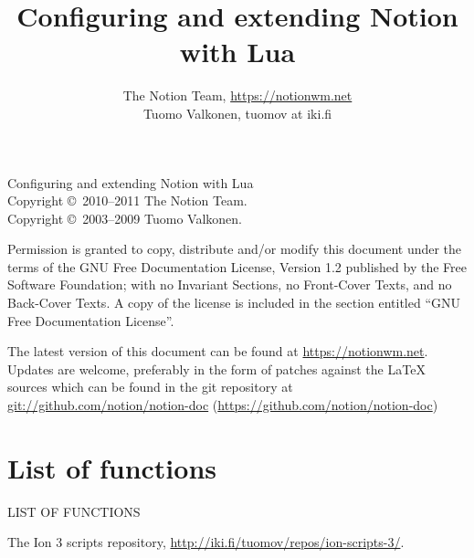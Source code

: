 \documentclass[english,a4paper,11pt,oldtoc,mctitle]{rapport3}
\title{Configuring and extending Notion with Lua}
\author{The Notion Team, \url{https://notionwm.net} \\ 
	Tuomo Valkonen, tuomov at iki.fi}
\begin{document}
\maketitle

Configuring and extending Notion with Lua\\
Copyright \copyright\  2010--2011 The Notion Team.\\
Copyright \copyright\  2003--2009 Tuomo Valkonen.

Permission is granted to copy, distribute and/or modify this document
under the terms of the GNU Free Documentation License, Version 1.2
published by the Free Software Foundation;
with no Invariant Sections, no Front-Cover Texts, and no Back-Cover Texts.
A copy of the license is included in the section entitled ``GNU
Free Documentation License''.

The latest version of this document can be found at 
\url{https://notionwm.net}. Updates are
welcome, preferably in the form of patches against the \LaTeX{} sources which
can be found in the git repository at 
\url{git://github.com/notion/notion-doc} 
(\url{https://github.com/notion/notion-doc})

\tableofcontents













\appendix





\chapter*{List of functions}
%
         {\MakeUppercase{List of functions}}%

\makeatletter
\def\fnlisti#1{\@dottedtocline{1}{0em}{1.5em}{\lstinline!#1!}{\pageref{fn:#1}}}
{\parskip\z@}
\makeatother

\begin{htmlonly}
\newcommand{\fnlisti}[1]{\fnref{#1}\\}

\end{htmlonly}

\printindex

\begin{thebibliography}{9}
     The Ion 3 scripts repository,
        \url{http://iki.fi/tuomov/repos/ion-scripts-3/}.
\end{thebibliography}
\end{document}
